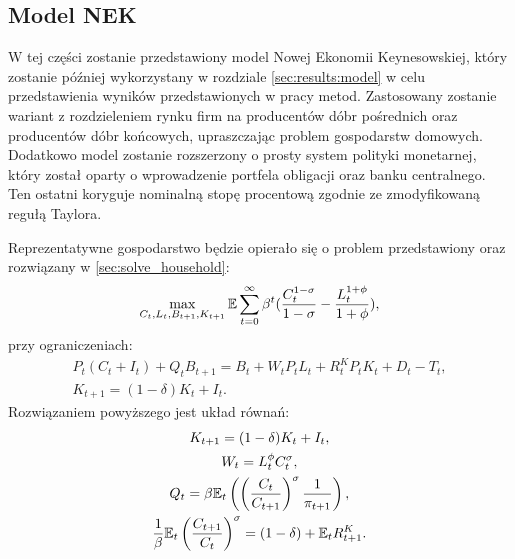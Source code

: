 \subsection{Model NEK}
\label{sec:nek_model_sample}

W tej części zostanie przedstawiony model Nowej Ekonomii Keynesowskiej, który zostanie później wykorzystany w rozdziale \ref{sec:results:model} w celu przedstawienia wyników przedstawionych w pracy metod. Zastosowany zostanie wariant z rozdzieleniem rynku firm na producentów dóbr pośrednich oraz producentów dóbr końcowych, upraszczając problem gospodarstw domowych. Dodatkowo model zostanie rozszerzony o prosty system polityki monetarnej, który został oparty o wprowadzenie portfela obligacji oraz banku centralnego. Ten ostatni koryguje nominalną stopę procentową zgodnie ze zmodyfikowaną regułą Taylora.

Reprezentatywne gospodarstwo będzie opierało się o problem przedstawiony oraz rozwiązany w \ref{sec:solve_household}:
\begin{equation}
    \max_{C_{t}, L_{t}, B_{t+1}, K_{t+1}}\mathbb{E} \sum_{t=0}^{\infty} \beta^t(\frac{C^{1-\sigma}_{t}}{1-\sigma} - \frac{L^{1+\phi}_{t}}{1+\phi}),
\end{equation}
przy ograniczeniach:
\begin{gather}
    P_t(C_t + I_t) + Q_t B_{t+1} = B_{t} + W_t P_t L_t + R^K_t P_t K_t + D_t - T_t, \\
    K_{t+1} = (1-\delta)K_t + I_t.
\end{gather}
Rozwiązaniem powyższego jest układ równań:
\begin{gather}
    \label{eq:nek_sample_household_start}
    K_{t+1} = (1-\delta)K_t + I_t,\\
    W_t = L_t^{\phi} C_t^{\sigma}, \\
    Q_t = \beta \mathbb{E}_t \left( \left(\frac{C_t}{C_{t+1}}\right)^\sigma \frac{1}{\pi_{t+1}}\right), \\
    \label{eq:nek_sample_household_end}
    \frac{1}{\beta}\mathbb{E}_t\left(\frac{C_{t+1}}{C_t}\right)^\sigma = (1-\delta) + \mathbb{E}_t R^K_{t+1}.
\end{gather}


